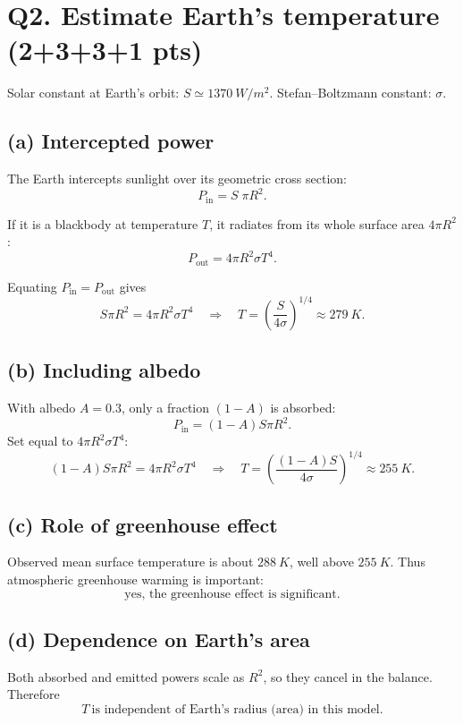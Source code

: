 \documentclass[11pt]{article}
\newcommand{\ans}[1]{\boxed{\displaystyle #1}}
\begin{document}
\section*{Q2. Estimate Earth's temperature (2+3+3+1 pts)}

Solar constant at Earth's orbit: \(S\simeq\SI{1370}{W/m^2}\).
Stefan--Boltzmann constant: \(\sigma\).

\subsection*{(a) Intercepted power}
The Earth intercepts sunlight over its geometric cross section:
\[
P_{\text{in}} = S\;\pi R^2.
\]

If it is a blackbody at temperature \(T\), it radiates from its whole
surface area \(4\pi R^2\):
\[
P_{\text{out}} = 4\pi R^2\sigma T^4.
\]

Equating \(P_{\text{in}} = P_{\text{out}}\) gives
\[
S\pi R^2 = 4\pi R^2\sigma T^4
\quad\Rightarrow\quad
T = \left(\frac{S}{4\sigma}\right)^{1/4}
 \approx \ans{\SI{279}{K}}.
\]

\subsection*{(b) Including albedo}
With albedo \(A=0.3\), only a fraction \((1-A)\) is absorbed:
\[
P_{\text{in}} = (1-A)S\pi R^2.
\]
Set equal to \(4\pi R^2\sigma T^4\):
\[
(1-A)S\pi R^2 = 4\pi R^2\sigma T^4
\quad\Rightarrow\quad
T = \left(\frac{(1-A)S}{4\sigma}\right)^{1/4}
 \approx \ans{\SI{255}{K}}.
\]

\subsection*{(c) Role of greenhouse effect}
Observed mean surface temperature is about \(\SI{288}{K}\), well above
\(\SI{255}{K}\). Thus atmospheric greenhouse warming is
important: 
\[
\ans{\text{yes, the greenhouse effect is significant}}.
\]

\subsection*{(d) Dependence on Earth's area}
Both absorbed and emitted powers scale as \(R^2\), so they cancel in the
balance. Therefore
\[
\ans{T\ \text{is independent of Earth's radius (area) in this model}.}
\]

\end{document}
